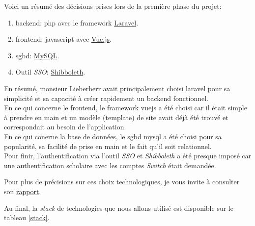 \documentclass[
    iai, %
    il, %
]{heig-tb}
\begin{document}
Voici un résumé des décisions prises lors de la première phase du projet:
\begin{enumerate}
    \item \Gls{backend}: \Gls{php} avec le \Gls{framework} \href{https://laravel.com/}{Laravel}.
    \item \Gls{frontend}: \Gls{javascript} avec \href{https://vuejs.org/}{Vue.js}.
    \item \Gls{sgbd}: \href{https://www.mysql.com/}{MySQL}.
    \item Outil \emph{SSO}: \href{https://www.switch.ch/aai/about/shibboleth/}{Shibboleth}.
\end{enumerate}

En résumé, monsieur Lieberherr avait principalement choisi \Gls{laravel} pour sa simplicité et sa capacité à créer rapidement un \Gls{backend} fonctionnel. \\
En ce qui concerne le \Gls{frontend}, le \Gls{framework} \Gls{vuejs} a été choisi car il était simple à prendre en main et un modèle (\Gls{template}) de site avait déjà été trouvé et correspondait au besoin de l'application. \\
En ce qui conerne la base de données, le \Gls{sgbd} \Gls{mysql} a été choisi pour sa popularité, sa facilité de prise en main et le fait qu'il soit relationnel. \\
Pour finir, l'authentification via l'outil \emph{SSO} et \emph{Shibboleth} a été presque imposé car une authentification scholaire avec les comptes \emph{Switch} était demandée.

Pour plus de précisions sur ces choix technologiques, je vous invite à consulter son \href{https://tb.heig-vd.ch/7532}{rapport}.

Au final, la \emph{stack} de technologies que nous allons utilisé est disponible sur le tableau \ref{stack}.
\end{document}
